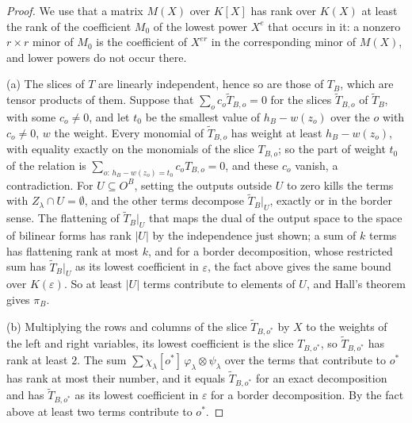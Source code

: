 \documentclass[11pt]{article}
\theoremstyle{definition}
\theoremstyle{remark}
\begin{document}
\begin{proof}
We use that a matrix $M(X)$ over $K[X]$ has rank over $K(X)$ at least the rank of the coefficient $M_0$ of the lowest power $X^e$ that occurs in it: a nonzero $r\times r$ minor of $M_0$ is the coefficient of $X^{er}$ in the corresponding minor of $M(X)$, and lower powers do not occur there.

(a) The slices of $T$ are linearly independent, hence so are those of $T_B$, which are tensor products of them. Suppose that $\sum_oc_o\tilde T_{B,o}=0$ for the slices $\tilde T_{B,o}$ of $\tilde T_B$, with some $c_o\ne0$, and let $t_0$ be the smallest value of $h_B-w(z_o)$ over the $o$ with $c_o\ne0$, $w$ the weight. Every monomial of $\tilde T_{B,o}$ has weight at least $h_B-w(z_o)$, with equality exactly on the monomials of the slice $T_{B,o}$; so the part of weight $t_0$ of the relation is $\sum_{o:\,h_B-w(z_o)=t_0}c_oT_{B,o}=0$, and these $c_o$ vanish, a contradiction. For $U\subseteq O^B$, setting the outputs outside $U$ to zero kills the terms with $Z_\lambda\cap U=\emptyset$, and the other terms decompose $\tilde T_B|_U$, exactly or in the border sense. The flattening of $\tilde T_B|_U$ that maps the dual of the output space to the space of bilinear forms has rank $|U|$ by the independence just shown; a sum of $k$ terms has flattening rank at most $k$, and for a border decomposition, whose restricted sum has $\tilde T_B|_U$ as its lowest coefficient in $\varepsilon$, the fact above gives the same bound over $K(\varepsilon)$. So at least $|U|$ terms contribute to elements of $U$, and Hall's theorem gives $\pi_B$.

(b) Multiplying the rows and columns of the slice $\tilde T_{B,o^*}$ by $X$ to the weights of the left and right variables, its lowest coefficient is the slice $T_{B,o^*}$, so $\tilde T_{B,o^*}$ has rank at least $2$. The sum $\sum\chi_\lambda[o^*]\,\varphi_\lambda\otimes\psi_\lambda$ over the terms that contribute to $o^*$ has rank at most their number, and it equals $\tilde T_{B,o^*}$ for an exact decomposition and has $\tilde T_{B,o^*}$ as its lowest coefficient in $\varepsilon$ for a border decomposition. By the fact above at least two terms contribute to $o^*$.
\end{proof}
\end{document}
